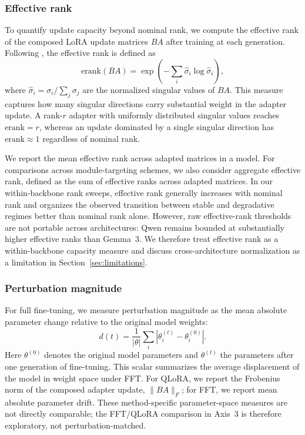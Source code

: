 \documentclass[a4paper,fleqn]{cas-dc}
\newif\ifshowchanges
\newcommand{\rev}[1]{\ifshowchanges{\color{blue}#1}\else{#1}\fi}
\begin{document}
\subsubsection{Effective rank}\label{sec:erank}
To quantify update capacity beyond nominal rank, we compute the effective rank
of the composed LoRA update matrices $BA$ after training at each generation.
Following \citet{roy2007}, the effective rank is defined as
\begin{equation}\label{eq:erank}
    \mathrm{erank}(BA) =
    \exp\!\left(-\sum_i \hat{\sigma}_i \log \hat{\sigma}_i\right),
\end{equation}
where $\hat{\sigma}_i = \sigma_i / \sum_j \sigma_j$ are the normalized singular
values of $BA$. This measure captures how many singular directions carry
substantial weight in the adapter update. A rank-$r$ adapter with uniformly
distributed singular values reaches $\mathrm{erank}=r$, whereas an update
dominated by a single singular direction has $\mathrm{erank}\approx 1$ regardless
of nominal rank.

We report the mean effective rank across adapted
matrices in a model. For comparisons across module-targeting schemes, we also
consider aggregate effective rank, defined as the sum of effective ranks across
adapted matrices. In our within-backbone rank sweeps, effective rank generally
increases with nominal rank and organizes the observed transition between
stable and degradative regimes better than nominal rank alone. However,
raw effective-rank thresholds are not portable across architectures: Qwen
remains bounded at substantially higher effective ranks than Gemma~3. We
therefore treat effective rank as a within-backbone capacity measure and discuss
cross-architecture normalization as a limitation in Section~\ref{sec:limitations}.

\subsubsection{Perturbation magnitude}\label{sec:pertmag}
For full fine-tuning, we measure perturbation magnitude as the mean absolute
parameter change relative to the original model weights:
\begin{equation}\label{eq:drift}
    \rev{d(t)} =
    \frac{1}{|\theta|}\sum_i |\theta^{(t)}_i - \theta^{(0)}_i|.
\end{equation}
Here $\theta^{(0)}$ denotes the original model parameters and $\theta^{(t)}$
the parameters after one generation of fine-tuning.
This scalar summarizes the
average displacement of the model in weight space under FFT. For QLoRA, we report the Frobenius norm of the composed adapter
update, $\|BA\|_F$; for FFT, we report mean absolute parameter drift.
These method-specific parameter-space measures are not directly
comparable; the FFT/QLoRA comparison in Axis~3 is therefore exploratory, not perturbation-matched.
\end{document}
